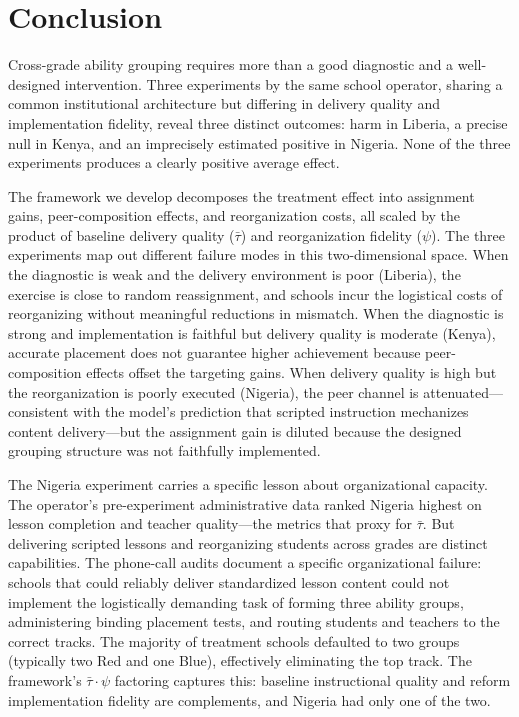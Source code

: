 \documentclass[11pt]{article}
\begin{document}
\section{Conclusion}
\label{sec:conclusion}

Cross-grade ability grouping requires more than a good diagnostic and a well-designed intervention. Three experiments by the same school operator, sharing a common institutional architecture but differing in delivery quality and implementation fidelity, reveal three distinct outcomes: harm in Liberia, a precise null in Kenya, and an imprecisely estimated positive in Nigeria. None of the three experiments produces a clearly positive average effect.

The framework we develop decomposes the treatment effect into assignment gains, peer-composition effects, and reorganization costs, all scaled by the product of baseline delivery quality ($\bar{\tau}$) and reorganization fidelity ($\psi$). The three experiments map out different failure modes in this two-dimensional space. When the diagnostic is weak and the delivery environment is poor (Liberia), the exercise is close to random reassignment, and schools incur the logistical costs of reorganizing without meaningful reductions in mismatch. When the diagnostic is strong and implementation is faithful but delivery quality is moderate (Kenya), accurate placement does not guarantee higher achievement because peer-composition effects offset the targeting gains. When delivery quality is high but the reorganization is poorly executed (Nigeria), the peer channel is attenuated---consistent with the model's prediction that scripted instruction mechanizes content delivery---but the assignment gain is diluted because the designed grouping structure was not faithfully implemented.

The Nigeria experiment carries a specific lesson about organizational capacity. The operator's pre-experiment administrative data ranked Nigeria highest on lesson completion and teacher quality---the metrics that proxy for $\bar{\tau}$. But delivering scripted lessons and reorganizing students across grades are distinct capabilities. The phone-call audits document a specific organizational failure: schools that could reliably deliver standardized lesson content could not implement the logistically demanding task of forming three ability groups, administering binding placement tests, and routing students and teachers to the correct tracks. The majority of treatment schools defaulted to two groups (typically two Red and one Blue), effectively eliminating the top track. The framework's $\bar{\tau} \cdot \psi$ factoring captures this: baseline instructional quality and reform implementation fidelity are complements, and Nigeria had only one of the two.
\end{document}
